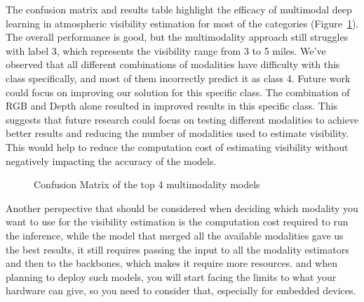 The confusion matrix and results table highlight the efficacy of multimodal deep learning in atmospheric visibility estimation for most of the categories (Figure~\ref{fig:conf_mats}). The overall performance is good, but the multimodality approach still struggles with label 3, which represents the visibility range from 3 to 5 miles. We've observed that all different combinations of modalities have difficulty with this class specifically, and most of them incorrectly predict it as class 4. Future work could focus on improving our solution for this specific class. The combination of RGB and Depth alone resulted in improved results in this specific class. This suggests that future research could focus on testing different modalities to achieve better results and reducing the number of modalities used to estimate visibility. This would help to reduce the computation cost of estimating visibility without negatively impacting the accuracy of the models.

\begin{figure}
    \centering
    \begin{subfigure}[b]{0.4\textwidth}
    
    
    \end{subfigure}
    \begin{subfigure}[b]{0.4\textwidth}
        
    \end{subfigure}
    \begin{subfigure}[b]{0.4\textwidth}
            
    \end{subfigure}
    \begin{subfigure}[b]{0.4\textwidth}
            
    \end{subfigure}
    \caption{Confusion Matrix of the top 4 multimodality models}
    \label{fig:conf_mats}
\end{figure}


Another perspective that should be considered when deciding which modality you want to use for the visibility estimation is the computation cost required to run the inference, while the model that merged all the available modalities gave us the best results, it still requires passing the input to all the modality estimators and then to the backbones, which makes it require more resources. and when planning to deploy such models, you will start facing the limits to what your hardware can give, so you need to consider that, especially for embedded devices.

